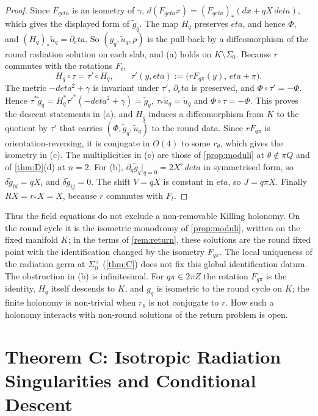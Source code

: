 \documentclass[11pt]{article}
\theoremstyle{canonmath}
\theoremstyle{canonpostulate}
\theoremstyle{canonproposition}
\theoremstyle{canonmath}
\theoremstyle{canonproposition}
\providecommand{\Klein}{\mathcal{K}}
\providecommand{\Z}{\mathbb{Z}}
\def\mathrm#1{#1}%
\def\mathbb#1{#1}%
\def\mathcal#1{#1}%
\def\eta{eta}%
\begin{document}
\begin{proof}
Since $F_{q\eta}$ is an isometry of $\gamma$, $d(F_{q\eta}x) = (F_{q\eta})_*(dx + qX\,d\eta)$, which gives the displayed form of $\tilde g_q$. The map $H_q$ preserves $\eta$, and hence $\Phi$, and $(H_q)_*\tilde u_q = \partial_\eta$. So $(g_q,\tilde u_q,\rho)$ is the pull-back by a diffeomorphism of the round radiation solution on each slab, and (a) holds on $\Klein\setminus\Sigma_0$. Because $r$ commutes with the rotations $F_t$,
\[
H_q\circ\tau = \tau'\circ H_q, \qquad \tau'(y,\eta) := \bigl(rF_{q\pi}(y),\,\eta+\pi\bigr).
\]
The metric $-d\eta^2+\gamma$ is invariant under $\tau'$, $\partial_\eta$ is preserved, and $\Phi\circ\tau' = -\Phi$. Hence $\tau^*\tilde g_q = H_q^*\tau'^*(-d\eta^2+\gamma) = \tilde g_q$, $\tau_*\tilde u_q = \tilde u_q$ and $\Phi\circ\tau = -\Phi$. This proves the descent statements in (a), and $H_q$ induces a diffeomorphism from $\Klein$ to the quotient by $\tau'$ that carries $(\Phi,\tilde g_q,\tilde u_q)$ to the round data. Since $rF_{q\pi}$ is orientation-reversing, it is conjugate in $\mathrm{O}(4)$ to some $r_\theta$, which gives the isometry in (c). The multiplicities in (c) are those of \cref{prop:moduli} at $\theta\notin\pi\mathbb Q$ and of \cref{thm:D}(d) at $n=2$. For (b), $\partial_q\tilde g_q|_{q=0} = 2X^\flat\,d\eta$ in symmetrised form, so $\delta\tilde g_{0i} = qX_i$ and $\delta\tilde g_{ij} = 0$. The shift $V = qX$ is constant in $\eta$, so $J = q\pi X$. Finally $RX = r_*X = X$, because $r$ commutes with $F_t$.
\end{proof}

Thus the field equations do not exclude a non-removable Killing holonomy. On the round cycle it is the isometric monodromy of \cref{prop:moduli}, written on the fixed manifold $\Klein$; in the terms of \cref{rem:return}, these solutions are the round fixed point with the identification changed by the isometry $F_{q\pi}$. The local uniqueness of the radiation germ at $\Sigma_0^+$ (\cref{thm:C}) does not fix this global identification datum. The obstruction in (b) is infinitesimal. For $q\pi\in2\pi\Z$ the rotation $F_{q\pi}$ is the identity, $H_q$ itself descends to $\Klein$, and $g_q$ is isometric to the round cycle on $\Klein$; the finite holonomy is non-trivial when $r_\theta$ is not conjugate to $r$. How such a holonomy interacts with non-round solutions of the return problem is open.

\section{Theorem C: Isotropic Radiation Singularities and Conditional Descent}
\label{sec:C}
\end{document}
